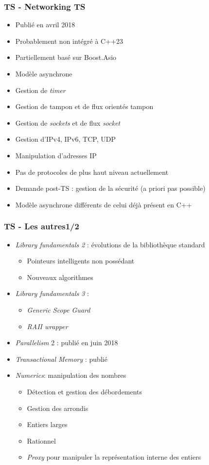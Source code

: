 \documentclass[C++.tex]{subfiles}
\begin{document}
\begin{frame}
	\frametitle{TS - Networking TS}
	\begin{itemize}
		\item Publié en avril 2018
		\item Probablement non intégré à C++23
		\item Partiellement basé sur Boost.Asio
		\item Modèle asynchrone
		\item Gestion de \textit{timer}
		\item Gestion de tampon et de flux orientés tampon
		\item Gestion de \textit{sockets} et de flux \og \textit{socket}\fg{}
		\item Gestion d'IPv4, IPv6, TCP, UDP
		\item Manipulation d'adresses IP
		\item Pas de protocoles de plus haut niveau actuellement
		\item Demande post-TS : gestion de la sécurité (a priori pas possible)
		\item Modèle asynchrone différents de celui déjà présent en C++
	\end{itemize}
\end{frame}

\begin{frame}
	\frametitle{TS - Les autres\titlehfill{}1/2}
	\begin{itemize}
		\item \textit{Library fundamentals 2} : évolutions de la bibliothèque standard
		\begin{itemize}
			\item Pointeurs intelligents non possédant
			\item Nouveaux algorithmes
		\end{itemize}
		\item \textit{Library fundamentals 3} :
		\begin{itemize}
			\item \textit{Generic Scope Guard}
			\item \textit{RAII wrapper}
		\end{itemize}
		\item \textit{Parallelism} 2 : publié en juin 2018
		\item \textit{Transactional Memory} : publié
		\item \textit{Numerics}: manipulation des nombres
		\begin{itemize}
			\item Détection et gestion des débordements
			\item Gestion des arrondis
			\item Entiers larges
			\item Rationnel
			\item \textit{Proxy} pour manipuler la représentation interne des entiers
		\end{itemize}
	\end{itemize}
\end{frame}
\end{document}
